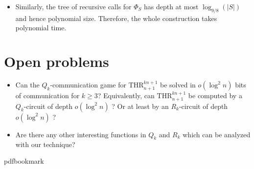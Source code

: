 \documentclass[11pt]{article}
\numberwithin{equation}{section}
\theoremstyle{definition}
\theoremstyle{plain}
\def\THR{\mathrm{THR}}
\begin{document}
\begin{itemize}
\item Similarly, the tree of recursive calls for $\Phi_S$ has depth at most $\log_{9/8}(|S|)$ and hence polynomial size. Therefore, the whole construction takes polynomial time.
\end{itemize}


\section{Open problems} \label{sec:open_prob}

\begin{itemize}
\item Can the $Q_k$-communication game for $\THR^{kn + 1}_{n + 1}$ be solved in $o(\log^2 n)$ bits of communication for $k\ge 3$? Equivalently, can $\THR^{kn + 1}_{n + 1}$ be computed by 
%
a $Q_k$-circuit of depth $o(\log^2 n)$ ?  %
Or at least by %
an $R_k$-circuit of depth $o(\log^2 n)$ ?  %

\item Are there any other interesting functions in $Q_k$ and $R_k$ which can be analyzed with our technique?
\end{itemize}

\newcommand{\prelim}{Preliminary version in\ }\newcommand{\prelims}{Preliminary
  versions in\ }
\providecommand{\bibhead}[1]{}
\expandafter\ifx\csname pdfbookmark\endcsname\relax%
  \providecommand{\tocrefpdfbookmark}{}
\else\providecommand{\tocrefpdfbookmark}{%
   \hypertarget{tocreferences}{}%
   \pdfbookmark[1]{References}{tocreferences}}%
\fi
\end{document}
